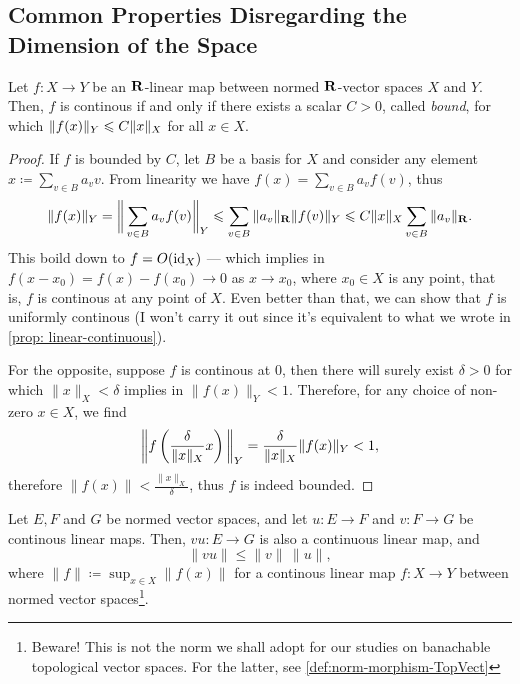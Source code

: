 
\subsection{Common Properties Disregarding the Dimension of the Space}

\begin{proposition}
\label{prop:continous-linear-thus-bounded}
Let \(f: X \to Y\) be an \(\mathbf{R}\)-linear map between normed \(\mathbf{R}\)-vector spaces
\(X\) and \(Y\). Then, \(f\) is continous if and only if there exists a scalar
\(C > 0\), called \emph{bound}, for which \(\lVert f(x)\rVert_Y \leqslant C \lVert x\rVert_{X}\)
for all \(x \in X\).
\end{proposition}

\begin{proof}
If \(f\) is bounded by \(C\), let \(B\) be a basis for \(X\) and consider any
element \(x \coloneq \sum_{v \in B} a_{v} v\). From linearity we have \(f(x) =
\sum_{v \in B} a_v f(v)\), thus
\[
  \| f(x) \|_Y = \bigg\| \sum_{v \in B} a_v f(v) \bigg\|_{Y}
  \leqslant \sum_{v \in B} \| a_v \|_{\mathbf{R}} \| f(v) \|_{Y}
  \leqslant C \|x\|_{X} \sum_{v \in B} \|a_v\|_{\mathbf{R}}.
\]
This boild down to \(f = O(\operatorname{id}_{X})\) --- which implies in \(f(x - x_0) = f(x) -
f(x_0) \to 0\) as \(x \to x_0\), where \(x_0 \in X\) is any point, that is,
\(f\) is continous at any point of \(X\). Even better than that, we can show
that \(f\) is uniformly continous (I won't carry it out since it's equivalent to
what we wrote in \cref{prop: linear-continuous}).

For the opposite, suppose \(f\) is continous at \(0\), then there will surely
exist \(\delta > 0\) for which \(\|x\|_X < \delta\) implies in
\(\|f(x)\|_Y < 1\). Therefore, for any choice of non-zero \(x \in X\), we
find
\[
  \bigg\| f \left( \frac{\delta}{\lVert x\rVert_X} x \right) \bigg\|_Y
  = \frac{\delta}{\| x \|_X} \| f(x) \|_{Y} < 1,
\]
therefore \(\| f(x) \| < \frac{\| x \|_{X}}{\delta}\), thus \(f\) is indeed
bounded.
\end{proof}

\begin{proposition}
\label{prop:composition-banach-morphisms}
Let \(E, F\) and \(G\) be normed vector spaces, and let \(u: E \to F\) and \(v:
F \to G\) be continous linear maps. Then, \(v u: E \to G\) is also a continuous
linear map, and
\[
  \|v u\| \leq \|v\|\, \|u\|,
\]
where \(\|f\| \coloneq \sup_{x \in X} \|f(x)\|\) for a continous linear
map \(f: X \to Y\) between normed vector spaces\footnote{Beware! This is not the
norm we shall adopt for our studies on banachable topological vector spaces. For
the latter, see \cref{def:norm-morphism-TopVect}}.
\end{proposition}

